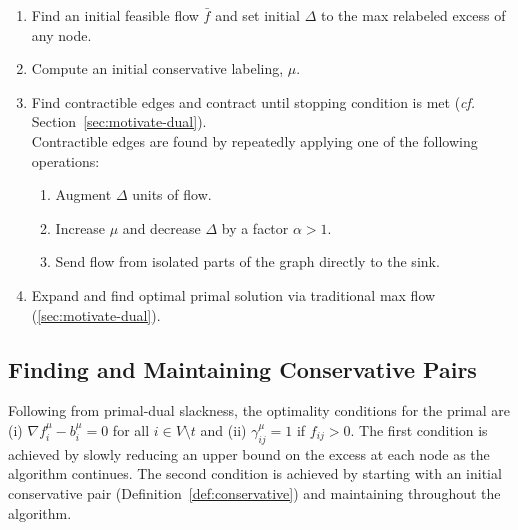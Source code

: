 \documentclass[11pt]{article}
\theoremstyle{definition}
\newtheorem{definition}{Definition}[section]
\theoremstyle{definition}
\theoremstyle{definition}
\newcommand{\fu}{f^{\mu}}
\newcommand{\nfiu}{\nabla \fu_i}
\newcommand{\biu}{b_{i}^{\mu}}
\newcommand{\giij}{\gamma_{ij}^{\mu}}
\newcommand{\vnott}{V \setminus t}
\begin{document}
\begin{enumerate}[(1),itemsep=0mm]
\item Find an initial feasible flow $\bar{f}$ and set initial $\Delta$ to
	  the max relabeled excess of any node.
\item Compute an initial conservative labeling, $\mu$.
\item \label{step:2013-contract} Find contractible edges and contract until stopping condition is met
	(\emph{cf.} Section~\ref{sec:motivate-dual}).\\
	Contractible edges are found
	by repeatedly applying one of the following operations:
	\begin{enumerate}
		\item Augment $\Delta$ units of flow.
		\item Increase $\mu$ and decrease $\Delta$ by a factor $\alpha > 1$.
		\item Send flow from isolated parts of the graph directly to the sink.
	\end{enumerate}
\item Expand and find optimal primal solution via traditional max flow (\ref{sec:motivate-dual}).
\end{enumerate}


\subsection{Finding and Maintaining Conservative Pairs}
\label{sec:findconserv2013}
Following from primal-dual slackness, the optimality conditions for the primal
are (i) $\nfiu - \biu = 0$ for all $i \in \vnott$ and (ii) $\giij = 1$ if
$f_{ij} > 0$. The first condition is achieved by slowly reducing an upper bound
on the excess at each node as the algorithm continues. The second condition is
achieved by starting with an initial conservative pair (Definition~\ref{def:conservative})
and maintaining throughout the algorithm.
\end{document}
